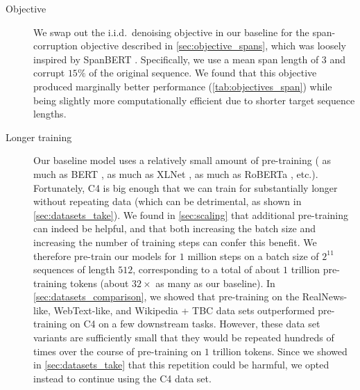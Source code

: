 \begin{description}

\item[Objective] We swap out the i.i.d.\ denoising objective in our baseline for the span-corruption objective described in \ref{sec:objective_spans}, which was loosely inspired by SpanBERT \citep{joshi2019spanbert}. Specifically, we use a mean span length of $3$ and corrupt $15\%$ of the original sequence. We found that this objective produced marginally better performance (\ref{tab:objectives_span}) while being slightly more computationally efficient due to shorter target sequence lengths.

\item[Longer training] Our baseline model uses a relatively small amount of pre-training ( as much as BERT \citep{devlin2018bert},  as much as XLNet \citep{yang2019xlnet},  as much as RoBERTa \citep{liu2019roberta}, etc.). Fortunately, C4 is big enough that we can train for substantially longer without repeating data (which can be detrimental, as shown in \ref{sec:datasets_take}).
We found in \ref{sec:scaling} that additional pre-training can indeed be helpful, and that both increasing the batch size and increasing the number of training steps can confer this benefit. We therefore pre-train our models for $1$ million steps on a batch size of $2^{11}$ sequences of length $512$, corresponding to a total of about $1$ trillion pre-training tokens (about $32\times$ as many as our baseline). In \ref{sec:datasets_comparison}, we showed that pre-training on the RealNews-like, WebText-like, and Wikipedia + TBC data sets outperformed pre-training on C4 on a few downstream tasks. However, these data set variants are sufficiently small that they would be repeated hundreds of times over the course of pre-training on $1$ trillion tokens. Since we showed in \ref{sec:datasets_take} that this repetition could be harmful, we opted instead to continue using the C4 data set.


\end{description}
